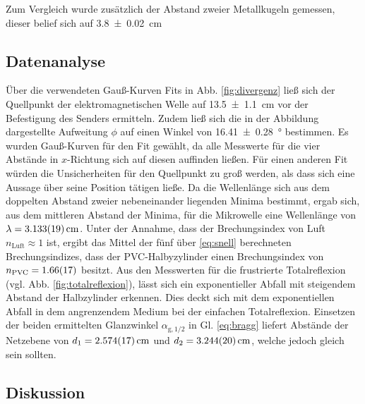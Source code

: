 		Zum Vergleich wurde zusätzlich der Abstand zweier Metallkugeln gemessen, dieser belief sich auf \SI{3,8+-0,02}{\centi\meter} 
		
	\subsection{Datenanalyse}
		
		Über die verwendeten Gauß-Kurven Fits in Abb. \ref{fig:divergenz} ließ sich der Quellpunkt der elektromagnetischen Welle auf \SI{13.5+-1.1}{\centi\meter} vor der Befestigung des Senders ermitteln.
		Zudem ließ sich die in der Abbildung dargestellte Aufweitung $\phi$ auf einen Winkel von \SI{16.41+-0.28}{\degree} bestimmen.
		Es wurden Gauß-Kurven für den Fit gewählt, da alle Messwerte für die vier Abstände in $x$-Richtung sich auf diesen auffinden ließen. 
		Für einen anderen Fit würden die Unsicherheiten für den Quellpunkt zu groß werden, als dass sich eine Aussage über seine Position tätigen ließe. %
		Da die Wellenlänge sich aus dem doppelten Abstand zweier nebeneinander liegenden Minima bestimmt, ergab sich, aus dem mittleren Abstand der Minima, für die Mikrowelle eine Wellenlänge von $\lambda = \SI{3.133+-0.019}{\centi\meter}$. 
		Unter der Annahme, dass der Brechungsindex von Luft $n_\text{Luft}\approx 1$ ist, ergibt das Mittel der fünf über \ref{eq:snell} berechneten Brechungsindizes, dass der PVC-Halbyzylinder einen Brechungsindex von $n_\text{PVC} = \SI{1.66+-0.17}{}$ besitzt.
		Aus den Messwerten für die frustrierte Totalreflexion (vgl. Abb. \ref{fig:totalreflexion}), lässt sich ein exponentieller Abfall mit steigendem Abstand der Halbzylinder erkennen.
		Dies deckt sich mit dem exponentiellen Abfall in dem angrenzendem Medium bei der einfachen Totalreflexion.
		Einsetzen der beiden ermittelten Glanzwinkel $\alpha_{\text{g},1/2}$ in Gl. \ref{eq:bragg} liefert Abstände der Netzebene von $d_1 = \SI{2.574+-0.017}{\centi\meter}$ und $d_2 = \SI{3.244+-0.020}{\centi\meter}$, welche jedoch gleich sein sollten.
		
	\subsection{Diskussion}
	

